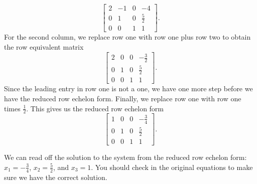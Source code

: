 \begin{example}
\[\renewcommand{\arraystretch}{1.4} \left[ \begin{array}{crc|r} 2&-1&0&-4 \\ 0&1&0&\frac{5}{2} \\ 0&0&1&1 \end{array} \right].\] 
For the second column, we replace row one with row one plus row two to obtain the row equivalent matrix
\[\renewcommand{\arraystretch}{1.4} \left[ \begin{array}{ccc|r} 2&0&0&-\frac{3}{2} \\ 0&1&0&\frac{5}{2} \\ 0&0&1&1 \end{array} \right].\] 
Since the leading entry in row one is not a one, we have one more step before we have the reduced row echelon form. Finally, we replace row one with row one times $\frac{1}{2}$. This gives us the reduced row echelon form
\[\renewcommand{\arraystretch}{1.4} \left[ \begin{array}{ccc|r} 1&0&0&-\frac{3}{4} \\ 0&1&0&\frac{5}{2} \\ 0&0&1&1 \end{array} \right].\] 
\item We can read off the solution to the system from the reduced row echelon form: $x_1 = -\frac{3}{4}$, $x_2 = \frac{5}{2}$, and $x_3 = 1$. You should check in the original equations to make sure we have the correct solution. 
\ea

 \end{example}
 
